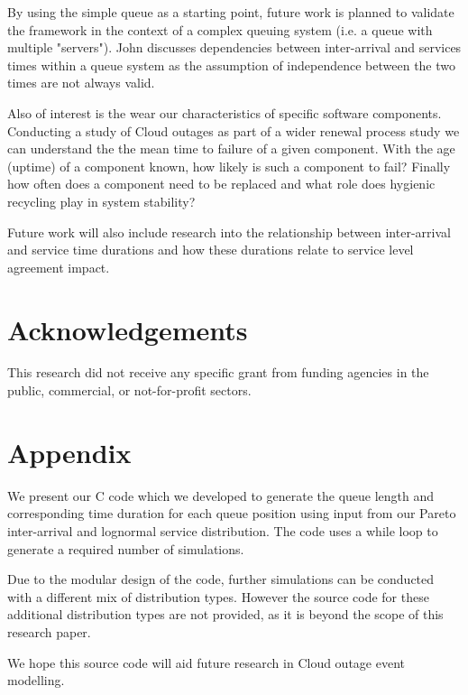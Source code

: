 \documentclass[5p]{elsarticle}
\begin{document}
By using the simple queue as a starting point, future work is planned to validate the framework in the context of a complex queuing system (i.e. a queue with multiple "servers"). John \cite{john1963single} discusses dependencies between inter-arrival and services times within a queue system as the assumption of independence between the two times are not always valid.

Also of interest is the wear our characteristics of specific software components. Conducting a study of Cloud outages as part of a wider renewal process study we can understand the the mean time to failure of a given component.  With the age (uptime) of a component known, how likely is such a component to fail? Finally how often does a component need to be replaced and what role does hygienic recycling play in system stability?

Future work will also include research into the relationship between inter-arrival and service time durations and how these durations relate to service level agreement impact.

\section{Acknowledgements}

This research did not receive any specific grant from funding agencies in the public, commercial, or not-for-profit sectors.

\section{Appendix}

We present our C code which we developed to generate the queue length and corresponding time duration for each queue position using input from our Pareto inter-arrival and lognormal service distribution. The code uses a while loop to generate a required number of simulations.

Due to the modular design of the code, further simulations can be conducted with a different mix of distribution types. However the source code for these additional distribution types are not provided, as it is beyond the scope of this research paper.

We hope this source code will aid future research in Cloud outage event modelling.

\vspace{+2mm}

\end{document}

